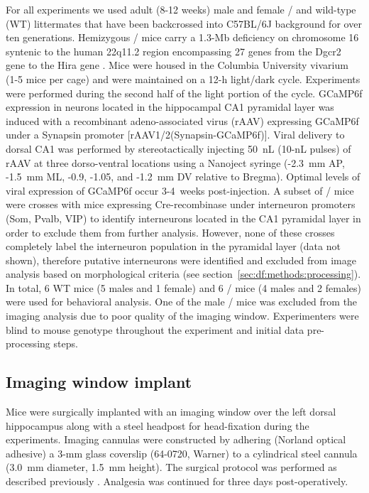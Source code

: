 For all experiments we used adult (8-12 weeks) male and female \df/ and wild-type (WT) littermates that have been backcrossed into C57BL/6J background for over ten generations. Hemizygous \df/ mice carry a 1.3-Mb deficiency on chromosome 16 syntenic to the human 22q11.2 region encompassing 27 genes from the Dgcr2 gene to the Hira gene \citep{Mukai2008, Stark2008}. Mice were housed in the Columbia University vivarium (1-5 mice per cage) and were maintained on a 12-h light/dark cycle. Experiments were performed during the second half of the light portion of the cycle.  GCaMP6f expression in neurons located in the hippocampal CA1 pyramidal layer was induced with a recombinant adeno-associated virus (rAAV) expressing GCaMP6f under a Synapsin promoter [rAAV1/2(Synapsin-GCaMP6f)]. Viral delivery to dorsal CA1 was performed by stereotactically injecting 50~nL (10-nL pulses) of rAAV at three dorso-ventral locations using a Nanoject syringe (-2.3~mm AP, -1.5~mm ML, -0.9, -1.05, and -1.2~mm DV relative to Bregma). Optimal levels of viral expression of GCaMP6f occur 3-4~weeks post-injection. A subset of \df/ mice were crosses with mice expressing Cre-recombinase under interneuron promoters (Som, Pvalb, VIP) \citep{Lovett-Barron2014} to identify interneurons located in the CA1 pyramidal layer in order to exclude them from further analysis. However, none of these crosses completely label the interneuron population in the pyramidal layer (data not shown), therefore putative interneurons were identified and excluded from image analysis based on morphological criteria (see section~\ref{sec:df:methods:processing}). In total, 6 WT mice (5 males and 1 female) and 6 \df/ mice (4 males and 2 females) were used for behavioral analysis. One of the male \df/ mice was excluded from the imaging analysis due to poor quality of the imaging window. Experimenters were blind to mouse genotype throughout the experiment and initial data pre-processing steps.

\subsection{Imaging window implant}
\label{sec:df:methods:surgery}
Mice were surgically implanted with an imaging window over the left dorsal hippocampus along with a steel headpost for head-fixation during the experiments. Imaging cannulas were constructed by adhering (Norland optical adhesive) a 3-mm glass coverslip (64-0720, Warner) to a cylindrical steel cannula (3.0~mm diameter, 1.5~mm height).  The surgical protocol was performed as described previously \citep{Kaifosh2013, Lovett-Barron2014, Danielson2016b}. Analgesia was continued for three days post-operatively.

